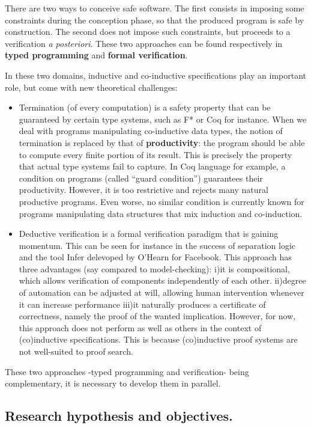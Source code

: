 \documentclass[11pt,twocolumn]{article}
\begin{document}
\smallskip
There are two ways to conceive safe software. The first consists in imposing some constraints
during the conception phase, so that the produced program is safe by construction. The second does not impose such constraints, but proceeds to a verification \textit{a posteriori}. These
two approaches can be found respectively in \textbf{typed programming} and \textbf{formal verification}.

\smallskip
In these two domains, inductive and co-inductive specifications play an important role, but come with new theoretical challenges:
\begin{itemize}
\item Termination (of every computation) is a safety property that can be guaranteed by
certain type systems, such as F* or Coq for instance. 
When we deal with programs manipulating co-inductive data types, the notion of termination
is replaced by that of \textbf{productivity}: the program should be able to compute every finite portion of its result. This is precisely the property that actual type systems fail 
to capture. In Coq language for example, a condition on programs (called ``guard condition'')
 guarantees their productivity. However, it is too restrictive and rejects many natural
productive programs. Even worse, no similar condition is currently known for programs manipulating data structures that mix induction and co-induction. 

\item Deductive verification is a formal verification paradigm that is gaining momentum. This can be seen for instance in the success of separation logic and the tool Infer delevoped by O'Hearn for Facebook. This approach has three advantages (say compared to model-checking):
i)it is compositional, which allows verification of components independently of each other.
ii)degree of automation can be adjusted at will, allowing human intervention whenever it can increase performance
iii)it naturally produces a certificate of correctness, namely the proof of the wanted implication. However, for now, this approach does not perform as well as others in the context of (co)inductive specifications. This is because (co)inductive proof systems are not well-suited to proof search.


\end{itemize}

These two approaches -typed programming and verification- being complementary, it is necessary to develop them in parallel.

\subsection{Research hypothesis and objectives.}
\end{document}
